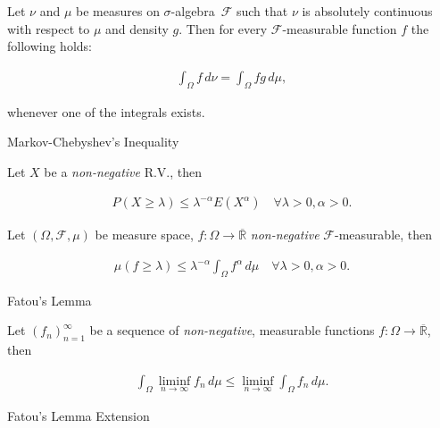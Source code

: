 \documentclass[10pt,landscape]{article}
\renewcommand{\leq}{\leqslant}
\renewcommand{\geq}{\geqslant}
\newcommand{\SigmaAlgebra}{$\sigma$-algebra}
\newcommand{\CalF}{\mathcal{F}}
\begin{document}
\begin{multicols}{3}
\begin{proposition}{3.16}{}
    Let $\nu$ and $\mu$ be measures on \SigmaAlgebra\ $\CalF$ such that $\nu$ is absolutely continuous with respect to $\mu$ and density $g$. Then for every $\CalF$-measurable function $f$ the following holds:

        \begin{align*}
            \int_{\Omega} f \, d\nu = \int_{\Omega} fg \, d\mu,
        \end{align*}

    whenever one of the integrals exists.

\end{proposition}

\begin{proposition}{3.18}{Markov-Chebyshev's Inequality}

    Let $X$ be a \emph{non-negative} R.V., then

        \begin{align*}
            P(X \geq \lambda) \leq \lambda^{-\alpha} E(X^{\alpha}) \quad \forall \lambda > 0, \alpha > 0.
        \end{align*}

\end{proposition}

\begin{remark}{3.3}{}

    Let $(\Omega, \mathcal{F}, \mu)$ be measure space, $f: \Omega \to \overline{\mathbb{R}}$ \emph{non-negative} $\mathcal{F}$-measurable, then

        \begin{align*}
            \mu(f \geq \lambda) \leq \lambda^{-\alpha} \int_{\Omega} f^{\alpha} \,d\mu \quad \forall \lambda > 0, \alpha > 0.
        \end{align*}

\end{remark}

\begin{lemma}{3.10}{Fatou's Lemma}

    Let $(f_n)_{n=1}^{\infty}$ be a sequence of \emph{non-negative}, measurable functions $f: \Omega \to \overline{\mathbb{R}}$, then

        \begin{align*}
            \int_{\Omega} \liminf_{n \to \infty} f_n \, d\mu \leq \liminf_{n \to \infty} \int_{\Omega} f_n \, d\mu.
        \end{align*}

\end{lemma}

\begin{corollary}{3.11}{Fatou's Lemma Extension}


\end{corollary}
\end{multicols}
\end{document}
